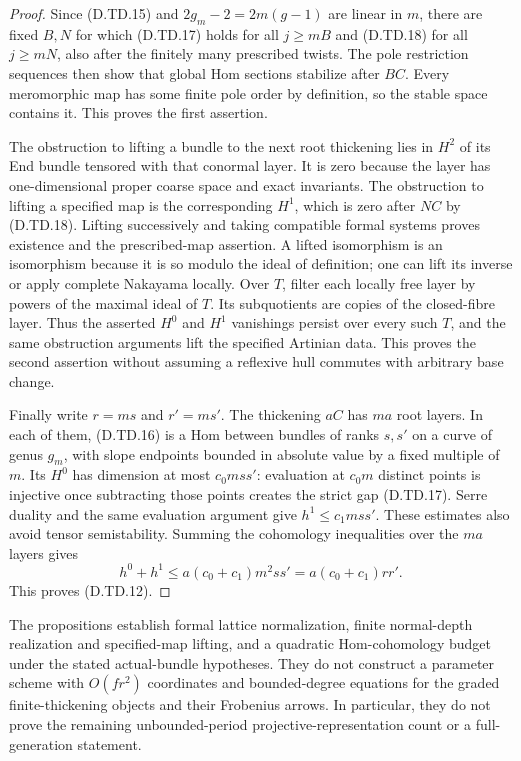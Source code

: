 \begin{proof}
Since (D.TD.15) and $2g_m-2=2m(g-1)$ are linear in $m$,
there are fixed $B,N$ for which (D.TD.17) holds for all
$j\geq mB$ and (D.TD.18) for all $j\geq mN$, also after the
finitely many prescribed twists. The pole restriction sequences
then show that global Hom sections stabilize after $BC$.
Every meromorphic map has some finite pole order by definition,
so the stable space contains it. This proves the first assertion.

The obstruction to lifting a bundle to the next root thickening
lies in $H^2$ of its End bundle tensored with that conormal layer.
It is zero because the layer has one-dimensional proper coarse
space and exact invariants. The obstruction to lifting a
specified map is the corresponding $H^1$, which is zero after
$NC$ by (D.TD.18). Lifting successively and taking compatible
formal systems proves existence and the prescribed-map assertion.
A lifted isomorphism is an isomorphism because it is so modulo
the ideal of definition; one can lift its inverse or apply
complete Nakayama locally. Over $T$, filter each locally free
layer by powers of the maximal ideal of $T$. Its subquotients
are copies of the closed-fibre layer. Thus the asserted $H^0$
and $H^1$ vanishings persist over every such $T$, and the same
obstruction arguments lift the specified Artinian data. This
proves the second assertion without assuming a reflexive hull
commutes with arbitrary base change.

Finally write $r=ms$ and $r'=ms'$. The thickening $aC$ has
$ma$ root layers. In each of them, (D.TD.16) is a Hom between
bundles of ranks $s,s'$ on a curve of genus $g_m$, with slope
endpoints bounded in absolute value by a fixed multiple of $m$.
Its $H^0$ has dimension at most $c_0mss'$: evaluation at
$c_0m$ distinct points is injective once subtracting those points
creates the strict gap (D.TD.17). Serre duality and the same
evaluation argument give $h^1\leq c_1mss'$. These estimates
also avoid tensor semistability. Summing the cohomology
inequalities over the $ma$ layers gives
\[
             h^0+h^1\leq a(c_0+c_1)m^2ss'
                            =a(c_0+c_1)rr'.
\]
This proves (D.TD.12).
\end{proof}

\begin{remark}
The propositions establish formal lattice normalization, finite
normal-depth realization and specified-map lifting, and a
quadratic Hom-cohomology budget under the stated actual-bundle
hypotheses. They do not construct a parameter scheme with
$O(fr^2)$ coordinates and bounded-degree equations for the
graded finite-thickening objects and their Frobenius arrows.
In particular, they do not prove the remaining unbounded-period
projective-representation count or a full-generation statement.
\end{remark}
